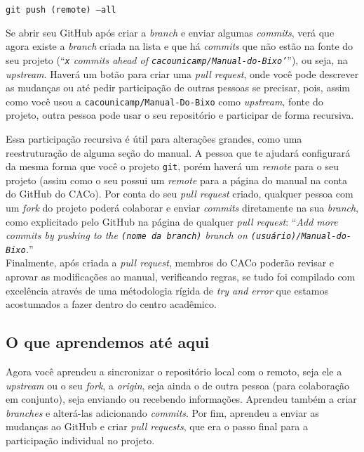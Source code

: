 \documentclass[a4paper,oneside,10pt]{memoir}
\begin{document}
\begin{center}
\texttt{git push (remote) --all}
\end{center}

Se abrir seu GitHub após criar a \emph{branch} e enviar algumas \emph{commits},
verá que agora existe a \emph{branch} criada na lista e que há \emph{commits}
que não estão na fonte do seu projeto (``\emph{\texttt{x} commits ahead of
\texttt{cacounicamp/Manual-do-Bixo'}}''), ou seja, na \emph{upstream}. Haverá um
botão para criar uma \emph{pull request}, onde você pode descrever as mudanças
ou até pedir participação de outras pessoas se precisar, pois, assim como você
usou a \texttt{cacounicamp/Ma\-nual-Do-Bixo} como \emph{upstream}, fonte
do projeto, outra pessoa pode usar o seu repositório e participar de forma
recursiva.

Essa participação recursiva é útil para alterações grandes, como uma
re\-estruturação de alguma seção do manual. A pessoa que te ajudará configurará
da mesma forma que você o projeto \texttt{git}, porém haverá um \emph{remote}
para o seu projeto (assim como o seu possui um \emph{remote} para a página do
manual na conta do GitHub do CACo). Por conta do seu \emph{pull request} criado,
qualquer pessoa com um \emph{fork} do projeto poderá colaborar e enviar
\emph{commits} diretamente na sua \emph{branch}, como explicitado pelo GitHub na
página de qualquer \emph{pull request}: ``\emph{Add more commits by pushing to
the \texttt{(nome da branch)} branch on \texttt{(usuário)/Manual-do-Bixo}.}''
\\

Finalmente, após criada a \emph{pull request}, membros do CACo poderão revisar e
aprovar as modificações ao manual, verificando regras, se tudo foi compilado com
excelência através de uma métodologia rígida de \emph{try and error} que estamos
acostumados a fazer dentro do centro acadêmico.

\subsection{O que aprendemos até aqui}

Agora você aprendeu a sincronizar o repositório local com o remoto, seja ele
a \emph{upstream} ou o seu \emph{fork}, a \emph{origin}, seja ainda o de outra
pessoa (para colabora\-ção em conjunto), seja enviando ou recebendo informações.
Aprendeu também a criar \emph{branches} e alterá-las adicionando \emph{commits}.
Por fim, aprendeu a enviar as mudanças ao GitHub e criar \emph{pull requests},
que era o passo final para a participação individual no projeto.
\end{document}
